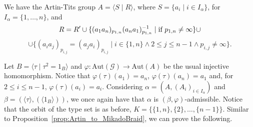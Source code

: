 \documentclass[11pt,letterpaper]{amsart}
\newcommand{\GG}{\mathcal{G}}
\newcommand{\Aut}{\mathrm{Aut}}
\begin{document}
 We have the Artin-Tits group $A=\langle S\mid R\rangle$, where $S=\{a_i\mid i\in I_\alpha\}$, for $I_\alpha=\{1,\ldots,n\}$, and
$$R=R'\cup \{(a_1a_n)_{p_{1,n}}(a_na_1)_{p_{1,n}}^{-1}\mid \textnormal{if }p_{1,n}\neq\infty\}\cup$$
$$\cup\{(a_ia_j)_{p_{i,j}}=(a_ja_i)_{p_{i,j}}\mid i\in\{1,n\}\wedge 2\leq j\leq n-1\wedge p_{i,j}\neq\infty\}.$$

Let $B=\langle \tau\mid \tau^2=1_B\rangle$ and $\varphi: \Aut(\GG)\to \Aut(A)$ be the usual injective homomorphism. Notice that $\varphi(\tau)(a_1)=a_n$, $\varphi(\tau)(a_n)=a_1$ and, for $2\leq i \leq n-1$, $\varphi(\tau)(a_i)=a_i$.
Considering $\alpha=(A,(A_i)_{i\in I_\alpha})$ and $\beta=(\langle\tau\rangle,(\langle 1_B\rangle))$, we once again have that $\alpha$ is $(\beta,\varphi)$-admissible. Notice that the orbit of the type set is as before, $K = \{\{1,n\},\{2\},\ldots,\{n-1\}\}$.
Similar to Proposition~\ref{prop:Artin_to_MikadoBraid}, we can prove the following.
\end{document}
